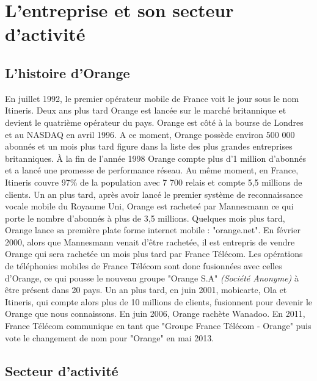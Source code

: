 \chapter{L'entreprise et son secteur d'activité}
\label{chap:premierchapitre}

\section{L'histoire d'Orange}


En juillet 1992, le premier opérateur mobile  de France voit le jour sous le nom Itineris. Deux ans plus tard Orange est lancée sur le marché britannique et devient le quatrième opérateur du pays. Orange est côté à la bourse de Londres et au NASDAQ en avril 1996. A ce moment, Orange possède environ 500 000 abonnés et un mois plus tard figure dans la liste des plus grandes entreprises britanniques. À la fin de l'année 1998 Orange compte plus d'1 million d'abonnés et a lancé une promesse de performance réseau. Au même moment, en France, Itineris couvre 97\% de la population avec 7 700 relais et compte 5,5 millions de clients. Un an plus tard, après avoir lancé le premier système de reconnaissance vocale mobile du Royaume Uni, Orange est racheteé par Mannesmann ce qui porte le nombre d'abonnés à plus de 3,5 millions. Quelques mois plus tard, Orange lance sa première plate forme internet mobile : "orange.net". En février 2000, alors que Mannesmann venait d'être rachetée, il est entrepris de vendre Orange qui sera rachetée un mois plus tard par France Télécom. Les opérations de téléphonies mobiles de France Télécom sont donc fusionnées avec celles d'Orange, ce qui pousse le nouveau groupe "Orange S.A" \textit{(Société Anonyme)} à être présent dans 20 pays. Un an plus tard, en juin 2001, mobicarte, Ola et Itineris, qui compte alors plus de 10 millions de clients, fusionnent pour devenir le Orange que nous connaissons. En juin 2006, Orange rachète Wanadoo. En 2011, France Télécom communique en tant que "Groupe France Télécom - Orange" puis vote le changement de nom pour "Orange" en mai 2013.



\section{Secteur d'activité}

